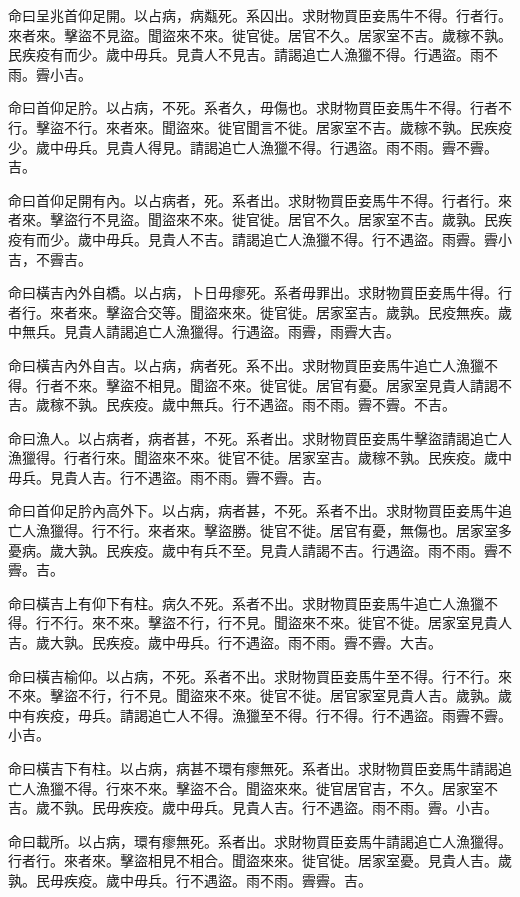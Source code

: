 命曰呈兆首仰足開。以占病，病甐死。系囚出。求財物買臣妾馬牛不得。行者行。來者來。擊盜不見盜。聞盜來不來。徙官徙。居官不久。居家室不吉。歲稼不孰。民疾疫有而少。歲中毋兵。見貴人不見吉。請謁追亡人漁獵不得。行遇盜。雨不雨。霽小吉。

命曰首仰足肣。以占病，不死。系者久，毋傷也。求財物買臣妾馬牛不得。行者不行。擊盜不行。來者來。聞盜來。徙官聞言不徙。居家室不吉。歲稼不孰。民疾疫少。歲中毋兵。見貴人得見。請謁追亡人漁獵不得。行遇盜。雨不雨。霽不霽。吉。

命曰首仰足開有內。以占病者，死。系者出。求財物買臣妾馬牛不得。行者行。來者來。擊盜行不見盜。聞盜來不來。徙官徙。居官不久。居家室不吉。歲孰。民疾疫有而少。歲中毋兵。見貴人不吉。請謁追亡人漁獵不得。行不遇盜。雨霽。霽小吉，不霽吉。

命曰橫吉內外自橋。以占病，卜日毋瘳死。系者毋罪出。求財物買臣妾馬牛得。行者行。來者來。擊盜合交等。聞盜來來。徙官徙。居家室吉。歲孰。民疫無疾。歲中無兵。見貴人請謁追亡人漁獵得。行遇盜。雨霽，雨霽大吉。

命曰橫吉內外自吉。以占病，病者死。系不出。求財物買臣妾馬牛追亡人漁獵不得。行者不來。擊盜不相見。聞盜不來。徙官徙。居官有憂。居家室見貴人請謁不吉。歲稼不孰。民疾疫。歲中無兵。行不遇盜。雨不雨。霽不霽。不吉。

命曰漁人。以占病者，病者甚，不死。系者出。求財物買臣妾馬牛擊盜請謁追亡人漁獵得。行者行來。聞盜來不來。徙官不徒。居家室吉。歲稼不孰。民疾疫。歲中毋兵。見貴人吉。行不遇盜。雨不雨。霽不霽。吉。

命曰首仰足肣內高外下。以占病，病者甚，不死。系者不出。求財物買臣妾馬牛追亡人漁獵得。行不行。來者來。擊盜勝。徙官不徙。居官有憂，無傷也。居家室多憂病。歲大孰。民疾疫。歲中有兵不至。見貴人請謁不吉。行遇盜。雨不雨。霽不霽。吉。

命曰橫吉上有仰下有柱。病久不死。系者不出。求財物買臣妾馬牛追亡人漁獵不得。行不行。來不來。擊盜不行，行不見。聞盜來不來。徙官不徙。居家室見貴人吉。歲大孰。民疾疫。歲中毋兵。行不遇盜。雨不雨。霽不霽。大吉。

命曰橫吉榆仰。以占病，不死。系者不出。求財物買臣妾馬牛至不得。行不行。來不來。擊盜不行，行不見。聞盜來不來。徙官不徙。居官家室見貴人吉。歲孰。歲中有疾疫，毋兵。請謁追亡人不得。漁獵至不得。行不得。行不遇盜。雨霽不霽。小吉。

命曰橫吉下有柱。以占病，病甚不環有瘳無死。系者出。求財物買臣妾馬牛請謁追亡人漁獵不得。行來不來。擊盜不合。聞盜來來。徙官居官吉，不久。居家室不吉。歲不孰。民毋疾疫。歲中毋兵。見貴人吉。行不遇盜。雨不雨。霽。小吉。

命曰載所。以占病，環有瘳無死。系者出。求財物買臣妾馬牛請謁追亡人漁獵得。行者行。來者來。擊盜相見不相合。聞盜來來。徙官徙。居家室憂。見貴人吉。歲孰。民毋疾疫。歲中毋兵。行不遇盜。雨不雨。霽霽。吉。

